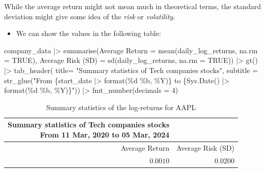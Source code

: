 \documentclass[
  12pt]{article}
\newenvironment{Shaded}{\begin{snugshade}}{\end{snugshade}}
\newcommand{\AttributeTok}[1]{\textcolor[rgb]{0.40,0.45,0.13}{#1}}
\newcommand{\ConstantTok}[1]{\textcolor[rgb]{0.56,0.35,0.01}{#1}}
\newcommand{\DecValTok}[1]{\textcolor[rgb]{0.68,0.00,0.00}{#1}}
\newcommand{\FunctionTok}[1]{\textcolor[rgb]{0.28,0.35,0.67}{#1}}
\newcommand{\NormalTok}[1]{\textcolor[rgb]{0.00,0.23,0.31}{#1}}
\newcommand{\OtherTok}[1]{\textcolor[rgb]{0.00,0.23,0.31}{#1}}
\newcommand{\SpecialCharTok}[1]{\textcolor[rgb]{0.37,0.37,0.37}{#1}}
\newcommand{\StringTok}[1]{\textcolor[rgb]{0.13,0.47,0.30}{#1}}
\providecommand{\tightlist}{%
  \setlength{\itemsep}{0pt}\setlength{\parskip}{0pt}}\usepackage{longtable,booktabs,array}
\theoremstyle{definition}
\theoremstyle{remark}
\begin{document}
\begin{tcolorbox}[enhanced jigsaw, rightrule=.15mm, colbacktitle=quarto-callout-caution-color!10!white, breakable, colback=white, titlerule=0mm, colframe=quarto-callout-caution-color-frame, opacityback=0, bottomrule=.15mm, opacitybacktitle=0.6, left=2mm, title=\textcolor{quarto-callout-caution-color}{\faFire}\hspace{0.5em}{A word of warning}, bottomtitle=1mm, coltitle=black, toptitle=1mm, arc=.35mm, toprule=.15mm, leftrule=.75mm]

While the average return might not mean much in theoretical terms, the
standard deviation might give some idea of the \emph{risk} or
\emph{volatility}.

\end{tcolorbox}

\begin{itemize}
\tightlist
\item
  We can show the values in the following table:
\end{itemize}

\begin{Shaded}
\begin{Highlighting}[]
\NormalTok{company\_data }\SpecialCharTok{|\textgreater{}} 
  \FunctionTok{summarise}\NormalTok{(}\StringTok{\textasciigrave{}}\AttributeTok{Average Return}\StringTok{\textasciigrave{}} \OtherTok{=} \FunctionTok{mean}\NormalTok{(daily\_log\_returns, }\AttributeTok{na.rm =} \ConstantTok{TRUE}\NormalTok{), }
            \StringTok{\textasciigrave{}}\AttributeTok{Average Risk (SD)}\StringTok{\textasciigrave{}} \OtherTok{=} \FunctionTok{sd}\NormalTok{(daily\_log\_returns, }\AttributeTok{na.rm =} \ConstantTok{TRUE}\NormalTok{)) }\SpecialCharTok{|\textgreater{}} 
  \FunctionTok{gt}\NormalTok{() }\SpecialCharTok{|\textgreater{}} 
  \FunctionTok{tab\_header}\NormalTok{(}
    \AttributeTok{title=} \StringTok{"Summary statistics of Tech companies stocks"}\NormalTok{,}
    \AttributeTok{subtitle  =} \FunctionTok{str\_glue}\NormalTok{(}\StringTok{"From \{start\_date |\textgreater{} format(\textquotesingle{}\%d \%b, \%Y\textquotesingle{})\} to \{Sys.Date() |\textgreater{} format(\textquotesingle{}\%d \%b, \%Y\textquotesingle{})\}"}\NormalTok{)) }\SpecialCharTok{|\textgreater{}} 
  \FunctionTok{fmt\_number}\NormalTok{(}\AttributeTok{decimals  =} \DecValTok{4}\NormalTok{)}
\end{Highlighting}
\end{Shaded}

\begin{longtable}{rr}

\caption{\label{tbl-summary-aapl}Summary statistics of the log-returns
for AAPL}

\tabularnewline

\caption*{
{\large Summary statistics of Tech companies stocks} \\ 
{\small From 11 Mar, 2020 to 05 Mar, 2024}
} \\ 
\toprule
Average Return & Average Risk (SD) \\ 
\midrule\addlinespace[2.5pt]
$0.0010$ & $0.0200$ \\ 
\bottomrule

\end{longtable}
\end{document}
